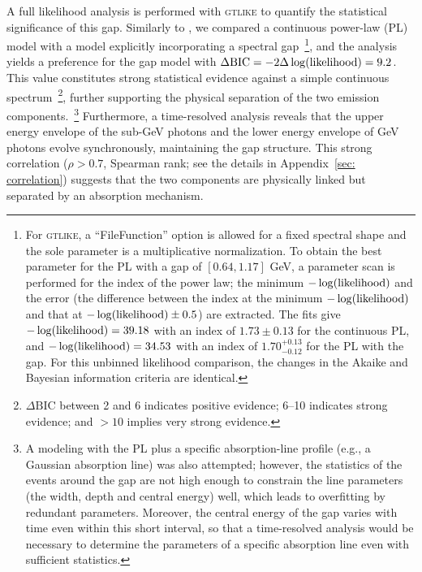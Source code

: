 \documentclass[prd,twocolumn,amsmath,amssymb,aps,linenumbers]{revtex4-2} %
\begin{document}
A full likelihood analysis is performed with \textsc{gtlike} to quantify the statistical significance of this gap. Similarly to \cite{2016MNRAS.463.1144W}, we compared a continuous power-law (PL) model with a model explicitly incorporating a spectral gap~\footnote{For \textsc{gtlike}, a ``FileFunction'' option is allowed for a fixed spectral shape and the sole parameter is a multiplicative normalization. To obtain the best parameter for the PL with a gap of $[0.64, 1.17]$ GeV, a parameter scan is performed for the index of the power law; the minimum $-\log(\rm likelihood)$ and the error (the difference between the index at the minimum $-\log(\rm likelihood)$ and that at $-\log({\rm likelihood})\pm0.5$) are extracted. The fits give $-\log({\rm likelihood})=39.18$ with an index of $1.73\pm0.13$ for the continuous PL, and $-\log({\rm likelihood})=34.53$ with an index of $1.70^{+0.13}_{-0.12}$ for the PL with the gap. For this unbinned likelihood comparison, the changes in the Akaike and Bayesian information criteria are identical.}, and the analysis yields a preference for the gap model with $\Delta \mathrm{BIC}=-2\Delta\log({\rm likelihood})=9.2$. This value constitutes strong statistical evidence against a simple continuous spectrum~\footnote{$\Delta \mathrm{BIC}$ between 2 and 6 indicates positive evidence; 6--10 indicates strong evidence; and $>10$ implies very strong evidence.}, further supporting the physical separation of the two emission components.~\footnote{A modeling with the PL plus a specific absorption-line profile (e.g., a Gaussian absorption line) was also attempted; however, the statistics of the events around the gap are not high enough to constrain the line parameters (the width, depth and central energy) well, which leads to overfitting by redundant parameters. Moreover, the central energy of the gap varies with time even within this short interval, so that a time-resolved analysis would be necessary to determine the parameters of a specific absorption line even with sufficient statistics.} Furthermore, a time-resolved analysis reveals that the upper energy envelope of the sub-GeV photons and the lower energy envelope of GeV photons evolve synchronously, maintaining the gap structure. This strong correlation ($\rho > 0.7$, Spearman rank; see the details in Appendix~\ref{sec: correlation}) suggests that the two components are physically linked but separated by an absorption mechanism.
\end{document}
